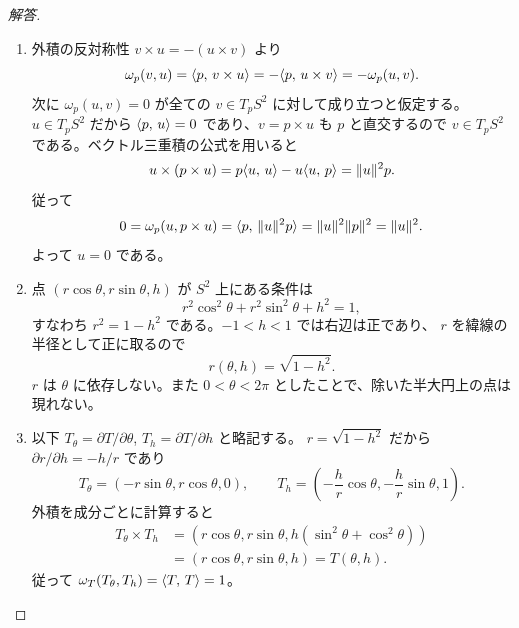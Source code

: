 \begin{proof}[解答]
\begin{enumerate}
  \item[(1)] 外積の反対称性 $v\times u=-(u\times v)$ より
  \[
  \omega_p(v,u)=\langle p,\, v\times u \rangle
  =-\langle p,\, u\times v \rangle=-\omega_p(u,v).
  \]
  次に $\omega_p(u,v)=0$ が全ての $v\in T_pS^2$ に対して成り立つと仮定する。
  $u\in T_pS^2$ だから $\langle p,\, u \rangle=0$ であり、$v=p\times u$ も $p$ と直交するので
  $v\in T_pS^2$ である。ベクトル三重積の公式を用いると
  \[
  u\times(p\times u)
  =p\langle u,\, u \rangle-u\langle u,\, p \rangle
  =\lVert u \rVert^2p.
  \]
  従って
  \[
  0=\omega_p(u,p\times u)
  =\langle p,\, \lVert u \rVert^2p \rangle
  =\lVert u \rVert^2\lVert p \rVert^2=\lVert u \rVert^2.
  \]
  よって $u=0$ である。

  \item[(2)] 点 $(r\cos\theta,r\sin\theta,h)$ が $S^2$ 上にある条件は
  \[
  r^2\cos^2\theta+r^2\sin^2\theta+h^2=1,
  \]
  すなわち $r^2=1-h^2$ である。$-1<h<1$ では右辺は正であり、
  $r$ を緯線の半径として正に取るので
  \[
  r(\theta,h)=\sqrt{1-h^2}.
  \]
  $r$ は $\theta$ に依存しない。また $0<\theta<2\pi$ としたことで、除いた半大円上の点は現れない。

  \item[(3)] 以下 $T_\theta=\partial T/\partial\theta$, $T_h=\partial T/\partial h$ と略記する。
  $r=\sqrt{1-h^2}$ だから $\partial r/\partial h=-h/r$ であり
  \[
  T_\theta=(-r\sin\theta,r\cos\theta,0),\qquad
  T_h=\left(-\frac h r\cos\theta,-\frac h r\sin\theta,1\right).
  \]
  外積を成分ごとに計算すると
  \begin{align*}
  T_\theta\times T_h
  &=\left(r\cos\theta,r\sin\theta,
    h(\sin^2\theta+\cos^2\theta)\right)\\
  &=(r\cos\theta,r\sin\theta,h)=T(\theta,h).
  \end{align*}
  従って $\omega_T(T_\theta,T_h)=\langle T,\, T \rangle=1$。
\end{enumerate}
\end{proof}

